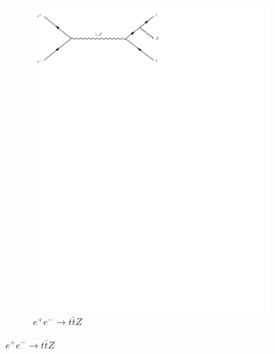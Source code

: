 \begin{figure}[h]
\begin{subfigure}[b]{0.3\textwidth}
    \includegraphics[trim={0.5cm 22cm 10cm 0cm},width=\textwidth]{../Diagrams/D20.pdf}
    \caption{$e^+e^- \rightarrow t\bar{t}Z$}
    \label{fey:20}
  \end{subfigure}
\end{figure}
